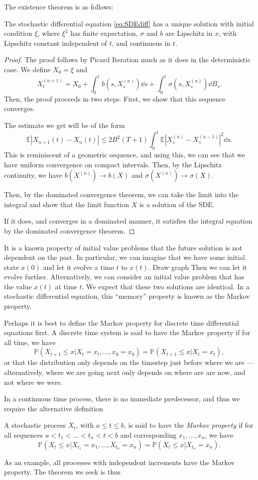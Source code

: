 \documentclass[prb,12pt]{revtex4-2}
\theoremstyle{definition}
\theoremstyle{definition}
\theoremstyle{definition}
\begin{document}
	The existence theorem is as follows:
	\begin{Theorem}
		The stochastic differential equation \eqref{eq:SDEdiff} has a unique solution with initial condition $\xi$, where $\xi^2$ has finite expectation, $\sigma$ and $b$ are Lipschitz in $x$, with Lipschitz constant independent of $t$, and continuous in $t$.
	\end{Theorem}
	\begin{proof}
		The proof follows by Picard Iteration much as it does in the deterministic case. We define $X_0=\xi$ and
		\[
		X_t^{(n+1)}=X_0+\int_0^t b(s, X_s^{(n)})\dd{s}+\int_0^t \sigma(s, X_s^{(n)})\dd{B_s}
		.\] 
		Then, the proof proceeds in two steps. First, we show that this sequence converges.
		{\color{red} The estimate we get will be of the form
		\[
				\mathbb{E}|X_{n+1}(t) - X_n(t)|\le 2B^2(T+1)\int_0^t \mathbb{E}|X^{(n)}_s - X^{(n-1)}_s|^2\dd{s}
		.\]
		This is reminiscent of a geometric sequence, and using this, we can see that we have uniform convergence on compact intervals. Then, by the Lipschitz continuity, we have $b(X^{(n)}) \to b(X)$ and $\sigma(X^{(n)})\to \sigma(X)$.
		
		Then, by the dominated convergence theorem, we can take the limit into the integral and show that the limit function $X$ is a solution of the SDE.
		}
		If it does, and converges in a dominated manner, it satisfies the integral equation by the dominated convergence theorem. 
	\end{proof}
	It is a known property of initial value problems that the future solution is not dependent on the past. In particular, we can imagine that we have some initial state $x(0)$ and let it evolve a time $t$ to $x(t)$. {\color{red} Draw graph} Then we can let it evolve further. Alternatively, we can consider an initial value problem that has the value $x(t)$ at time $t$. We expect that these two solutions are identical. In a stochastic differential equation, this ``memory'' property is known as the Markov property. {\color{red} Perhaps it is best to define the Markov property for discrete time differential equations first. A discrete time system is said to have the Markov property if for all time, we have
		\[\mathbb{P}(X_{t+1} \le x | X_t = x_t, \dots, x_0 = x_0) = \mathbb{P}(X_{t+1} \le x | X_t = x_t),\]
		or that the distribution only depends on the timestep just before where we are --- alternatively, where we are going next only depends on where are are now, and not where we were.
		
		In a continuous time process, there is no immediate predecessor, and thus we require the alternative definition} 
	\begin{Definition}
		A stochastic process $X_t$, with $a\le t \le b$, is said to have the \emph{Markov property} if for all sequences $a < t_1 < \dots < t_n < t < b$ and corresponding $x_1, \dots, x_n$, we have
		\[
		\mathbb{P}(X_t\le x|X_{t_1}=x_1, \dots, X_{t_n}=x_n) = \mathbb{P}(X_t\le x|X_{t_n}=x_n)
		.\] 
	\end{Definition}
	As an example, all processes with independent increments have the Markov property. The theorem we seek is thus
	
\end{document}
